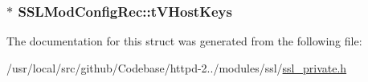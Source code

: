 \subsubsection[{\texorpdfstring{t\+V\+Host\+Keys}{tVHostKeys}}]{$\ast$ S\+S\+L\+Mod\+Config\+Rec\+::t\+V\+Host\+Keys}\hypertarget{structSSLModConfigRec_a9f994a465542b8d4a81381426b30069f}{}\label{structSSLModConfigRec_a9f994a465542b8d4a81381426b30069f}


The documentation for this struct was generated from the following file\+:\begin{DoxyCompactItemize}
\item 
/usr/local/src/github/\+Codebase/httpd-\/2../modules/ssl/\hyperlink{ssl__private_8h}{ssl\+\_\+private.\+h}\end{DoxyCompactItemize}
